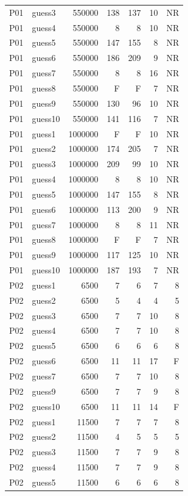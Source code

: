 {\begin{longtable}{llrrrrr}
P01 & guess3 & 550000 & 138 & 137 & 10 & NR \\
P01 & guess4 & 550000 & 8 & 8 & 10 & NR \\
P01 & guess5 & 550000 & 147 & 155 & 8 & NR \\
P01 & guess6 & 550000 & 186 & 209 & 9 & NR \\
P01 & guess7 & 550000 & 8 & 8 & 16 & NR \\
P01 & guess8 & 550000 & F & F & 7 & NR \\
P01 & guess9 & 550000 & 130 & 96 & 10 & NR \\
P01 & guess10 & 550000 & 141 & 116 & 7 & NR \\
P01 & guess1 & 1000000 & F & F & 10 & NR \\
P01 & guess2 & 1000000 & 174 & 205 & 7 & NR \\
P01 & guess3 & 1000000 & 209 & 99 & 10 & NR \\
P01 & guess4 & 1000000 & 8 & 8 & 10 & NR \\
P01 & guess5 & 1000000 & 147 & 155 & 8 & NR \\
P01 & guess6 & 1000000 & 113 & 200 & 9 & NR \\
P01 & guess7 & 1000000 & 8 & 8 & 11 & NR \\
P01 & guess8 & 1000000 & F & F & 7 & NR \\
P01 & guess9 & 1000000 & 117 & 125 & 10 & NR \\
P01 & guess10 & 1000000 & 187 & 193 & 7 & NR \\
P02 & guess1 & 6500 & 7 & 6 & 7 & 8 \\
P02 & guess2 & 6500 & 5 & 4 & 4 & 5 \\
P02 & guess3 & 6500 & 7 & 7 & 10 & 8 \\
P02 & guess4 & 6500 & 7 & 7 & 10 & 8 \\
P02 & guess5 & 6500 & 6 & 6 & 6 & 8 \\
P02 & guess6 & 6500 & 11 & 11 & 17 & F \\
P02 & guess7 & 6500 & 7 & 7 & 10 & 8 \\
P02 & guess9 & 6500 & 7 & 7 & 9 & 8 \\
P02 & guess10 & 6500 & 11 & 11 & 14 & F \\
P02 & guess1 & 11500 & 7 & 7 & 7 & 8 \\
P02 & guess2 & 11500 & 4 & 5 & 5 & 5 \\
P02 & guess3 & 11500 & 7 & 7 & 9 & 8 \\
P02 & guess4 & 11500 & 7 & 7 & 9 & 8 \\
P02 & guess5 & 11500 & 6 & 6 & 6 & 8 \\

\end{longtable}}
